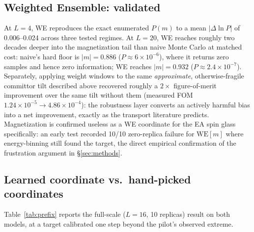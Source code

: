 \documentclass[a4paper,fleqn]{cas-sc}
\begin{document}
\subsection{Weighted Ensemble: validated}\label{sec:res-we}
At $L=4$, WE reproduces the exact enumerated $P(m)$ to a mean $|\Delta\ln P|$ of
0.006--0.024 across three tested regimes. At $L=20$, WE reaches roughly two decades deeper
into the magnetization tail than naive Monte Carlo at matched cost: naive's hard floor is
$|m|=0.886$ ($P\approx6\times10^{-6}$), where it returns zero samples and hence zero
information; WE reaches $|m|=0.932$ ($P\approx2.4\times10^{-7}$). Separately, applying
weight windows to the same \emph{approximate}, otherwise-fragile committor tilt described
above recovered roughly a $2\times$ figure-of-merit improvement over the same tilt without
them (measured FOM $1.24\times10^{-5}\to4.86\times10^{-4}$):
the robustness layer converts an actively harmful bias into a net improvement, exactly as
the transport literature predicts. Magnetization is confirmed useless as a WE coordinate
for the EA spin glass specifically: an early test recorded 10/10 zero-replica failure for
$\mathrm{WE}[m]$ where energy-binning still found the target, the direct empirical
confirmation of the frustration argument in \S\ref{sec:methods}.

\subsection{Learned coordinate vs.\ hand-picked coordinates}\label{sec:res-learned}
Table~\ref{tab:prefix} reports the full-scale ($L=16$, 10 replicas) result on both models,
at a target calibrated one step beyond the pilot's observed extreme.
\end{document}
